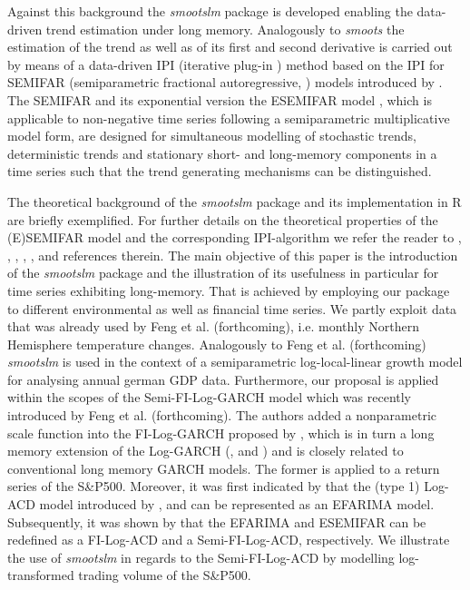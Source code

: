 \documentclass[12pt]{article}
\begin{document}
Against this background the \textit{smootslm} package is developed enabling the data-driven trend estimation under long memory. Analogously to \textit{smoots} the estimation of the trend as well as of its first and second derivative is carried out by means of a data-driven IPI (iterative plug-in \cite{gasser1991flexible}) method based on the IPI for SEMIFAR (semiparametric fractional autoregressive, \cite{beran2002semifar}) models introduced by \citet{beran2002iterative}. The SEMIFAR and its exponential version the ESEMIFAR model \citep{beran2015modelling}, which is applicable to non-negative time series following a semiparametric multiplicative model form, are designed for simultaneous modelling of stochastic trends, deterministic trends and stationary short- and long-memory components in a time series such that the trend generating mechanisms can be distinguished. 

The theoretical background of the \textit{smootslm} package and its implementation in R are briefly exemplified. For further details on the theoretical properties of the (E)SEMIFAR model and the corresponding IPI-algorithm we refer the reader to \citet{beran1999semifar}, \citet{beran2002semifar}, \citet{beran2002iterative}, \citet{beran2002local}, \citet{beran2015modelling}, \citet{beran2016long} and references therein. The main objective of this paper is the introduction of the \textit{smootslm} package and the illustration of its usefulness in particular for time series exhibiting long-memory. That is achieved by employing our package to different environmental as well as financial time series. We partly exploit data that was already used by Feng et al. (forthcoming), i.e. monthly Northern Hemisphere temperature changes. Analogously to Feng et al. (forthcoming) \textit{smootslm} is used in the context of a semiparametric log-local-linear growth model for analysing annual german GDP data. Furthermore, our proposal is applied within the scopes of the Semi-FI-Log-GARCH model which was recently introduced by Feng et al. (forthcoming). The authors added a nonparametric scale function into the FI-Log-GARCH proposed by \citet{feng2020fractionally}, which is in turn a long memory extension of the Log-GARCH (\citet{pantula1986modeling}, \cite{geweke1986comment} and \cite{milhoj1987conditional}) and is closely related to conventional long memory GARCH models. The former is applied to a return series of the S\&P500. Moreover, it was first indicated by \citet{beran2015modelling} that the (type 1) Log-ACD model introduced by \citet{bauwens2000logarithmic}, \citet{bauwens2008moments} and \citet{karanasos2008statistical} can be represented as an EFARIMA model. Subsequently, it was shown by \citet{feng2015forecasting} that the EFARIMA and ESEMIFAR can be redefined as a FI-Log-ACD and a Semi-FI-Log-ACD, respectively. We illustrate the use of \textit{smootslm} in regards to the Semi-FI-Log-ACD by modelling log-transformed trading volume of the S\&P500.
\end{document}
